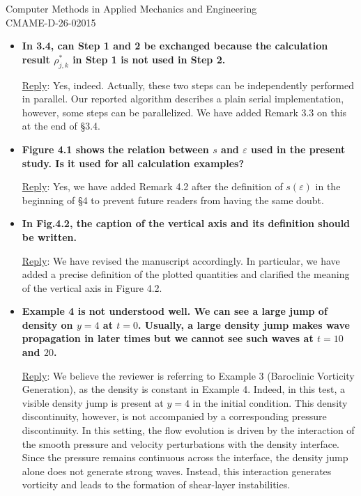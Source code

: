 \documentclass[letter,11pt]{letter}
\theoremstyle{remark}
\begin{document}
\begin{letter}{Computer Methods in Applied Mechanics and Engineering\\
CMAME-D-26-02015}
\begin{itemize}[wide, labelwidth=!, labelindent=0pt]
\begin{itemize}[wide, labelwidth=!, labelindent=0pt]
\smallskip
{\sc\underline{Reply}}: We have fixed it and introduced the abbreviation PCCU on page 2, where it is first mentioned.

\medskip
\item{\bf In 3.4, can Step 1 and 2 be exchanged because the calculation result $\rho_{j,k}^*$ in Step 1 is not used in Step 2.}

\smallskip
{\sc\underline{Reply}}: Yes, indeed. Actually, these two steps can be independently performed in parallel. Our reported algorithm
describes a plain serial implementation, however, some steps can be parallelized. We have added Remark 3.3 on this at the end of \S3.4.

\newpage
\item{\bf Figure 4.1 shows the relation between $s$ and $\varepsilon$ used in the present study. Is it used for all calculation examples?}

\smallskip
{\sc\underline{Reply}}: Yes, we have added Remark 4.2 after the definition of $s(\varepsilon)$ in the beginning of \S4 to prevent future
readers from having the same doubt.

\medskip
\item{\bf In Fig.4.2, the caption of the vertical axis and its definition should be written.}

\smallskip
{\sc\underline{Reply}}: We have revised the manuscript accordingly. In particular, we have added a precise definition of the plotted
quantities and clarified the meaning of the vertical axis in Figure 4.2.

\medskip
\item{\bf Example 4 is not understood well. We can see a large jump of density on $y=4$ at $t=0$. Usually, a large density jump makes wave
propagation in later times but we cannot see such waves at $t=10$ and $20$.}

\smallskip
{\sc\underline{Reply}}: We believe the reviewer is referring to Example 3 (Baroclinic Vorticity Generation), as the density is constant in
Example 4. Indeed, in this test, a visible density jump is present at $y=4$ in the initial condition. This density discontinuity, however,
is not accompanied by a corresponding pressure discontinuity. In this setting, the flow evolution is driven by the interaction of the smooth
pressure and velocity perturbations with the density interface. Since the pressure remains continuous across the interface, the density jump
alone does not generate strong waves. Instead, this interaction generates vorticity and leads to the formation of shear-layer instabilities.


\end{itemize}
\end{itemize}
\end{letter}
\end{document}
